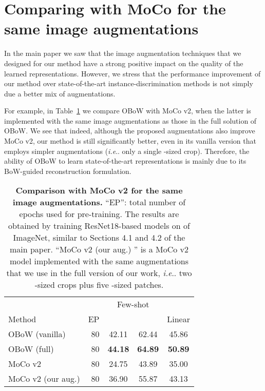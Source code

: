 \documentclass[final]{cvpr}
\makeatletter
\DeclareRobustCommand\onedot{\futurelet\@let@token\@onedot}
\def\@onedot{\ifx\@let@token.\else.\null\fi\xspace}
\def\ie{\emph{i.e}\onedot} \def\Ie{\emph{I.e}\onedot}
\makeatother
\begin{document}
 
{\small


}

\appendix
\section{Comparing with MoCo for the same image augmentations}

In the main paper we saw that the image augmentation techniques that we designed for our method have a strong positive impact on the quality of the learned representations. 
However, we stress that the performance improvement of our method over state-of-the-art instance-discrimination methods is not simply due a better mix of augmentations. 

For example, in Table~\ref{tab:comparison_mocov2} we compare OBoW with MoCo v2, when the latter is implemented with the same image augmentations as those in the full solution of OBoW.
We see that indeed, although the proposed augmentations also improve MoCo v2, our method is still significantly better, even in its vanilla version that employs simpler augmentations (\ie only a single -sized crop). 
Therefore, the ability of OBoW to learn state-of-the-art representations is mainly due to its BoW-guided reconstruction formulation.

\begin{table}[t!]
\centering
\renewcommand{\figurename}{Table}
\renewcommand{\captionlabelfont}{\bf}
\renewcommand{\captionfont}{\small} 
{\setlength{\extrarowheight}{2pt}\small
{
\begin{tabular}{ l  | r | c   c  | c  }
\toprule
& & \multicolumn{2}{c|}{Few-shot} & \multicolumn{1}{l}{}\\
\multicolumn{1}{l|}{Method} & EP & \multicolumn{1}{c}{} & \multicolumn{1}{c|}{} & \multicolumn{1}{l}{Linear}\\
\midrule
\;OBoW (vanilla)     &  80 & 42.11 & 62.44 & 45.86\\
\;OBoW (full)        &  80 & \textbf{44.18} & \textbf{64.89} & \textbf{50.89}\\
\midrule
\;MoCo v2            & 80 & 24.75 & 43.89 & 35.00 \\
\;MoCo v2 (our aug.) & 80 & 36.90 & 55.87 & 43.13 \\
\bottomrule
\end{tabular}}}
\vspace{-8pt}
\caption{
\textbf{Comparison with MoCo v2 for the same image augmentations.}
``EP'': total number of epochs used for pre-training.
The results are obtained by training ResNet18-based models on  of ImageNet, similar to Sections 4.1 and 4.2 of the main paper.
``MoCo v2 (our aug.) '' is a MoCo v2 model implemented with the same augmentations that we use in the full version of our work, \ie two -sized crops plus five -sized patches.
}
\vspace{-8pt}
\label{tab:comparison_mocov2}
\end{table}
\end{document}
